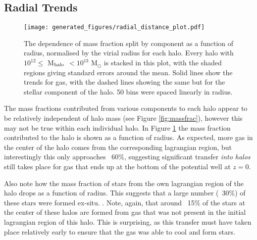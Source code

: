 \subsection{Radial Trends}

\begin{figure}
    \centering
    \texttt{[image: generated\_figures/radial\_distance\_plot.pdf]}
    \caption{The dependence of mass fraction split by component as a function of radius, normalised by the virial radius for each halo. Every halo with $10^{12} \leq $ M$_{\rm halo}$ $ < 10^{13}$ M$_\odot$ is stacked in this plot, with the shaded regions giving standard errors around the mean. Solid lines show the trends for gas, with the dashed lines showing the same but for the stellar component of the halo. 50 bins were spaced linearly in radius.}
    \label{fig:radialmassfrac}
\end{figure}

The mass fractions contributed from various components to each halo appear to be relatively independent of halo mass (see Figure \ref{fig:massfrac}), however this may not be true within each individual halo. In Figure \ref{fig:radialmassfrac} the mass fraction contributed to the halo is shown as a function of radius. As expected, more gas in the center of the halo comes from the corresponding lagrangian region, but interestingly this only approaches ~60\%, suggesting significant transfer \emph{into halos} still takes place for gas that ends up at the bottom of the potential well at $z=0$.

Also note how the mass fraction of stars from the own lagrangian region of the halo drops as a function of radius. This suggests that a large number (~30\%) of these stars were formed ex-situ. . Note, again, that around ~15\% of the stars at the center of these halos are formed from gas that was not present in the initial lagrangian region of this halo. This is surprising, as this transfer must have taken place relatively early to ensure that the gas was able to cool and form stars.
